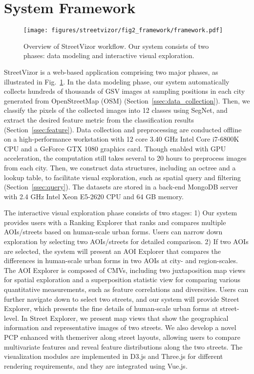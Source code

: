 \section{System Framework}



\begin{figure}[t]
	\centering
	\texttt{[image: figures/streetvizor/fig2\_framework/framework.pdf]}
	\vspace{-5mm}
	\caption{Overview of StreetVizor workflow. Our system consists of two phases: data modeling and interactive visual exploration.}
	\label{fig:sys_overview}
	\vspace{-6mm}
\end{figure}

StreetVizor is a web-based application comprising two major phases, as illustrated in Fig.~\ref{fig:sys_overview}.
In the data modeling phase, our system automatically collects hundreds of thousands of GSV images at sampling positions in each city generated from OpenStreetMap (OSM) (Section~\ref{ssec:data_collection}).
Then, we classify the pixels of the collected images into 12 classes using SegNet, and extract the desired feature metric from the classification results (Section~\ref{ssec:feature}).
Data collection and preprocessing are conducted offline on a high-performance workstation with 12 core 3.40 GHz Intel Core i7-6800K CPU and a GeForce GTX 1080 graphics card.
Though enabled with GPU acceleration, the computation still takes several to 20 hours to preprocess images from each city.
Then, we construct data structures, including an octree and a lookup table, to facilitate visual exploration, such as spatial query and filtering (Section~\ref{ssec:query}).
The datasets are stored in a back-end MongoDB server with 2.4 GHz Intel Xeon E5-2620 CPU and 64 GB memory.

The interactive visual exploration phase consists of two stages:
1) Our system provides users with a Ranking Explorer that ranks and compares multiple AOIs/streets based on human-scale urban forms.
Users can narrow down exploration by selecting two AOIs/streets for detailed comparison. 
2) If two AOIs are selected, the system will present an AOI Explorer that compares the differences in human-scale urban forms in two AOIs at city- and region-scales.
The AOI Explorer is composed of CMVs, including two juxtaposition map views for spatial exploration and a superposition statistic view for comparing various quantitative measurements, such as feature correlations and diversities.
Users can further navigate down to select two streets, and our system will provide Street Explorer, which presents the fine details of human-scale urban forms at street-level.
In Street Explorer, we present map views that show the geographical information and representative images of two streets.
We also develop a novel PCP enhanced with themeriver along street layouts, allowing users to compare multivariate features and reveal feature distributions along the two streets.
The visualization modules are implemented in D3.js and Three.js for different rendering requirements, and they are integrated using Vue.js.

